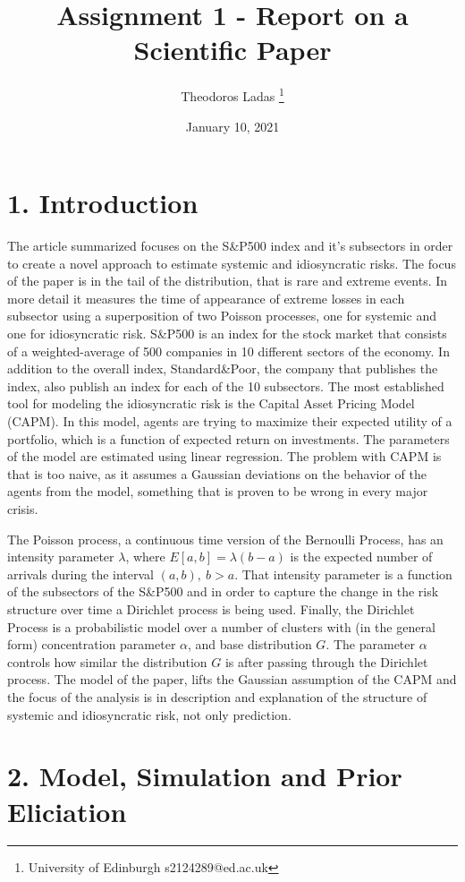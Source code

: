 \documentclass[a4paper]{report}
\title{Assignment 1 - Report on a Scientific Paper}
\author{
Theodoros Ladas
\footnote{University of Edinburgh s2124289@ed.ac.uk}
}
\date{January 10, 2021}
\begin{document}
\maketitle


\section*{1. Introduction}
The article summarized  \cite{rodriguez2017assessing} focuses on the S\&P500 index and it's subsectors in order to create a novel approach to estimate systemic and idiosyncratic risks. The focus of the paper is in the tail of the distribution, that is rare and extreme events. In more detail it measures the time of appearance of extreme losses in each subsector using a superposition of two Poisson processes, one for systemic and one for idiosyncratic risk. S\&P500 is an index for the stock market that consists of a weighted-average of 500 companies in 10 different sectors of the economy. In addition to the overall index, Standard\&Poor, the company that publishes the index, also publish an index for each of the 10 subsectors. The most established tool for modeling the idiosyncratic risk is the Capital Asset Pricing Model (CAPM). In this model, agents are trying to maximize their expected utility of a portfolio, which is a function of expected return on investments. The parameters of the model are estimated using linear regression. The problem with CAPM is that is too naive, as it assumes a Gaussian deviations on the behavior of the agents from the model, something that is proven to be wrong in every major crisis.

The Poisson process, a continuous time version of the Bernoulli Process, has an intensity parameter $\lambda$, where $E[a,b] = \lambda(b-a)$ is the expected number of arrivals during the interval $(a,b), ~b>a$. That intensity parameter is a function of the subsectors of the S\&P500 and in order to capture the change in the risk structure over time a Dirichlet process is being used. Finally, the Dirichlet Process is a probabilistic model over a number of clusters with (in the general form) concentration parameter $\alpha$, and base distribution $G$. The parameter $\alpha$ controls how similar the distribution $G$ is after passing through the Dirichlet process. The model of the paper, lifts the Gaussian assumption of the CAPM and the focus of the analysis is in description and explanation of the structure of systemic and idiosyncratic risk, not only prediction.
\section*{2. Model, Simulation and Prior Eliciation}
\end{document}
